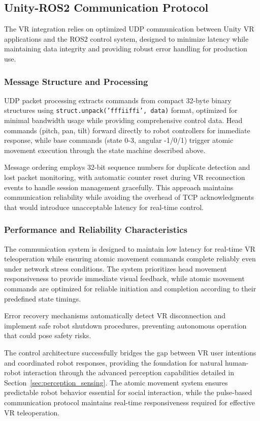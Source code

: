 \subsection{Unity-ROS2 Communication Protocol}

The VR integration relies on optimized UDP communication between Unity VR applications and the ROS2 control system, designed to minimize latency while maintaining data integrity and providing robust error handling for production use.

\subsubsection{Message Structure and Processing}
UDP packet processing extracts commands from compact 32-byte binary structures using \texttt{struct.unpack('fffiiffi', data)} format, optimized for minimal bandwidth usage while providing comprehensive control data. Head commands (pitch, pan, tilt) forward directly to robot controllers for immediate response, while base commands (state 0-3, angular -1/0/1) trigger atomic movement execution through the state machine described above.

Message ordering employs 32-bit sequence numbers for duplicate detection and lost packet monitoring, with automatic counter reset during VR reconnection events to handle session management gracefully. This approach maintains communication reliability while avoiding the overhead of TCP acknowledgments that would introduce unacceptable latency for real-time control.

\subsubsection{Performance and Reliability Characteristics}
The communication system is designed to maintain low latency for real-time VR teleoperation while ensuring atomic movement commands complete reliably even under network stress conditions. The system prioritizes head movement responsiveness to provide immediate visual feedback, while atomic movement commands are optimized for reliable initiation and completion according to their predefined state timings. 

Error recovery mechanisms automatically detect VR disconnection and implement safe robot shutdown procedures, preventing autonomous operation that could pose safety risks.

The control architecture successfully bridges the gap between VR user intentions and coordinated robot responses, providing the foundation for natural human-robot interaction through the advanced perception capabilities detailed in Section~\ref{sec:perception_sensing}. The atomic movement system ensures predictable robot behavior essential for social interaction, while the pulse-based communication protocol maintains real-time responsiveness required for effective VR teleoperation.
